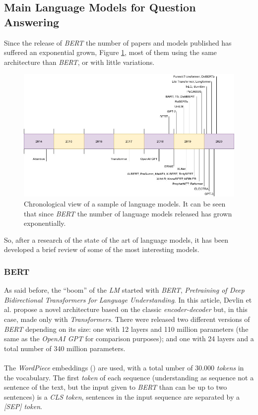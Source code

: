 \subsection{Main Language Models for Question Answering}
\noindent Since the release of \emph{BERT} the number of papers and models published has suffered an exponential grown, Figure \ref{fig:cronology}, most of them using the same architecture than \emph{BERT}, or with little variations.
\begin{figure}[h!]
	\centering
	\includegraphics[scale=0.35]{images/cronology}
	\caption{Chronological view of a sample of language models. It can be seen that since \emph{BERT} the number of language models released has grown exponentially.}
	\label{fig:cronology}
\end{figure}
So, after a research of the state of the art of language models, it has been developed a brief review of some of the most interesting models.
\subsubsection{BERT}
\noindent As said before, the ``boom'' of the \emph{LM} started with \emph{BERT}, \emph{Pre\-training of Deep Bidirectional Transformers for Language Understanding}\cite{Devlin2018}. In this article, Devlin et al. propose a novel architecture based on the classic \emph{encoder-decoder} but, in this case, made only with \emph{Transformers}. There were released two different versions of \emph{BERT} depending on its size: one with 12 layers and 110 million parameters (the same as the \emph{OpenAI GPT} for comparison purposes); and one with 24 layers and a total number of 340 million parameters.
\paragraph{}
The \emph{WordPiece} embeddings (\cite{Wu2016}) are used, with a total umber of 30.000 \emph{tokens} in the vocabulary. The first \emph{token} of each sequence (understanding as sequence not a sentence of the text, but the input given to \emph{BERT} than can be up to two sentences) is a \emph{{CLS} token}, sentences in the input sequence are separated by a \emph{[SEP] token}.
